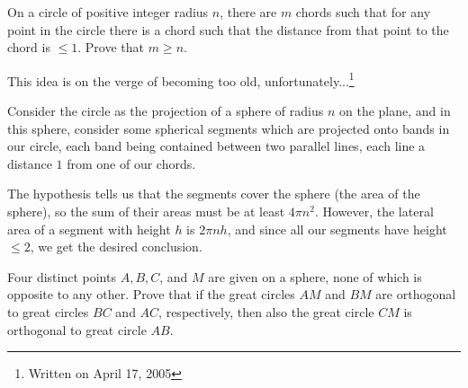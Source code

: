 \documentclass[12pt,a4paper]{memoir}
\theoremstyle{definition}
\begin{document}
\begin{question}
	On a circle of positive integer radius $n$, there are $m$ chords such that for any point in the circle there is a chord such that the distance from that point to the chord is $\leq 1$. Prove that $m \geq n$.
\end{question}


\begin{solution}[name={Solution by Grobber}] 
	This idea is on the verge of becoming too old, unfortunately...\footnote{Written on April 17, 2005}
	
	Consider the circle as the projection of a sphere of radius $n$ on the plane, and in this sphere, consider some spherical segments which are projected onto bands in our circle, each band being contained between two parallel lines, each line a distance $1$ from one of our chords.
	
	The hypothesis tells us that the segments cover the sphere (the area of the sphere), so the sum of their areas must be at least $4\pi n^2$. However, the lateral area of a segment with height $h$ is $2\pi nh$, and since all our segments have height $\le 2$, we get the desired conclusion.
\end{solution}



\begin{question}
	Four distinct points $A, B, C$, and $M$ are given on a sphere, none of which is opposite to any other. Prove that if the great circles $AM$ and $BM$ are orthogonal to great circles $BC$ and $AC$, respectively, then also the great circle $CM$ is orthogonal to great circle $AB$.
\end{question}
\end{document}
